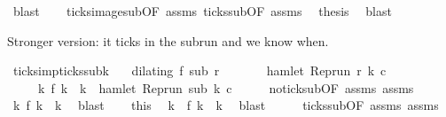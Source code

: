 \begin{isabellebody}
\ blast\isanewline
\ \ \isamarkupfalse%
\ ticks{\isacharunderscore}image{\isacharunderscore}sub{\isacharbrackleft}OF\ assms{\isacharparenleft}{}{\isacharparenright}{\isacharbrackright}\ ticks{\isacharunderscore}sub{\isacharbrackleft}OF\ assms{\isacharparenleft}{}{\isacharparenright}{\isacharbrackright}\ \isamarkupfalse%
\ {\isacharquery}thesis\ \isamarkupfalse%
\ blast\isanewline
{}\isamarkupfalse%
%
\endisatagproof
{\isafoldproof}%
%
\isadelimproof
%
\endisadelimproof
%
\begin{isamarkuptext}%
Stronger version: it ticks in the subrun and we know when.%
\end{isamarkuptext}\isamarkuptrue%
\isamarkupfalse%
\ ticks{\isacharunderscore}imp{\isacharunderscore}ticks{\isacharunderscore}subk{\isacharcolon}\isanewline
\ \ \ {\isacartoucheopen}dilating\ f\ sub\ r{\isacartoucheclose}\isanewline
\ \ \ \ \ \ \ {\isacartoucheopen}hamlet\ {\isacharparenleft}{\isacharparenleft}Rep{\isacharunderscore}run\ r{\isacharparenright}\ k\ c{\isacharparenright}{\isacartoucheclose}\isanewline
\ \ \ \ \ {\isacartoucheopen}{\isasymexists}k\ f\ k\ {\isacharequal}\ k\ {\isasymand}\ hamlet\ {\isacharparenleft}{\isacharparenleft}Rep{\isacharunderscore}run\ sub{\isacharparenright}\ k\ c{\isacharparenright}{\isacartoucheclose}\isanewline
%
\isadelimproof
%
\endisadelimproof
%
\isatagproof
{}\isamarkupfalse%
\ {\isacharminus}\isanewline
\ \ \isamarkupfalse%
\ no{\isacharunderscore}tick{\isacharunderscore}sub{\isacharbrackleft}OF\ assms{\isacharparenleft}{}{\isacharparenright}{\isacharbrackright}\ assms{\isacharparenleft}{}{\isacharparenright}\ \isamarkupfalse%
\ {\isacartoucheopen}{\isasymexists}k\ f\ k\ {\isacharequal}\ k{\isacartoucheclose}\ \isamarkupfalse%
\ blast\isanewline
\ \ \isamarkupfalse%
\ this\ \isamarkupfalse%
\ k\ \ {\isacartoucheopen}f\ k\ {\isacharequal}\ k{\isacartoucheclose}\ \isamarkupfalse%
\ blast\isanewline
\ \ \isamarkupfalse%
\ \isamarkupfalse%
\ ticks{\isacharunderscore}sub{\isacharbrackleft}OF\ assms{\isacharparenleft}{}{\isacharparenright}{\isacharbrackright}\ assms{\isacharparenleft}{}{\isacharparenright}\ \isamarkupfalse%

\end{isabellebody}
